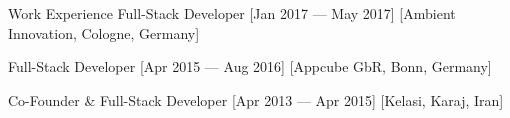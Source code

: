\begin{cvsection}{Work Experience}
    \cvitem
    {Full-Stack Developer}
    [Jan 2017 --- May 2017]
    [Ambient Innovation, Cologne, Germany]
    
    \cvitem
    {Full-Stack Developer}
    [Apr 2015 --- Aug 2016]
    [Appcube GbR, Bonn, Germany]
    
    \cvitem
    {Co-Founder \& Full-Stack Developer}
    [Apr 2013 --- Apr 2015]
    [Kelasi, Karaj, Iran]
\end{cvsection}